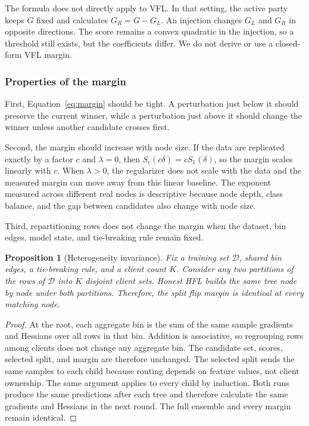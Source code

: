 \documentclass[11pt]{article}
\newtheorem{proposition}{Proposition}
\begin{document}
The formula does not directly apply to VFL. In that setting, the active party keeps $G$ fixed and calculates $G_R=G-G_L$. An injection changes $G_L$ and $G_R$ in opposite directions. The score remains a convex quadratic in the injection, so a threshold still exists, but the coefficients differ. We do not derive or use a closed-form VFL margin.

\subsubsection{Properties of the margin}

First, Equation~\ref{eq:margin} should be tight. A perturbation just below it should preserve the current winner, while a perturbation just above it should change the winner unless another candidate crosses first.

Second, the margin should increase with node size. If the data are replicated exactly by a factor $c$ and $\lambda=0$, then $S_c(c\delta)=cS_1(\delta)$, so the margin scales linearly with $c$. When $\lambda>0$, the regularizer does not scale with the data and the measured margin can move away from this linear baseline. The exponent measured across different real nodes is descriptive because node depth, class balance, and the gap between candidates also change with node size.

Third, repartitioning rows does not change the margin when the dataset, bin edges, model state, and tie-breaking rule remain fixed.

\begin{proposition}[Heterogeneity invariance]
\label{prop:heterogeneity}
Fix a training set $\mathcal{D}$, shared bin edges, a tie-breaking rule, and a client count $K$. Consider any two partitions of the rows of $\mathcal{D}$ into $K$ disjoint client sets. Honest HFL builds the same tree node by node under both partitions. Therefore, the split flip margin is identical at every matching node.
\end{proposition}

\begin{proof}
At the root, each aggregate bin is the sum of the same sample gradients and Hessians over all rows in that bin. Addition is associative, so regrouping rows among clients does not change any aggregate bin. The candidate set, scores, selected split, and margin are therefore unchanged. The selected split sends the same samples to each child because routing depends on feature values, not client ownership. The same argument applies to every child by induction. Both runs produce the same predictions after each tree and therefore calculate the same gradients and Hessians in the next round. The full ensemble and every margin remain identical.\qedhere
\end{proof}
\end{document}
